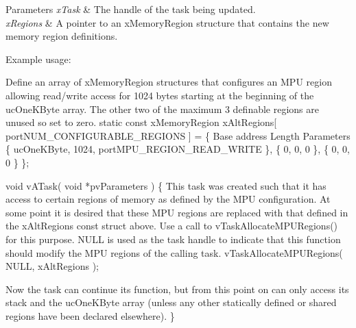 \begin{DoxyParams}{Parameters}
{\em x\-Task} & The handle of the task being updated.\\
\hline
{\em x\-Regions} & A pointer to an x\-Memory\-Region structure that contains the new memory region definitions.\\
\hline
\end{DoxyParams}
Example usage\-: 
\begin{DoxyPre}
Define an array of xMemoryRegion structures that configures an MPU region
allowing read/write access for 1024 bytes starting at the beginning of the
ucOneKByte array.  The other two of the maximum 3 definable regions are
unused so set to zero.
static const xMemoryRegion xAltRegions[ portNUM\_CONFIGURABLE\_REGIONS ] =
\{
Base address            Length          Parameters
        \{ ucOneKByte,           1024,           portMPU\_REGION\_READ\_WRITE \},
        \{ 0,                            0,                      0 \},
        \{ 0,                            0,                      0 \}
\};\end{DoxyPre}



\begin{DoxyPre}void vATask( void *pvParameters )
\{
This task was created such that it has access to certain regions of
memory as defined by the MPU configuration.  At some point it is
desired that these MPU regions are replaced with that defined in the
xAltRegions const struct above.  Use a call to vTaskAllocateMPURegions()
for this purpose.  NULL is used as the task handle to indicate that this
function should modify the MPU regions of the calling task.
        vTaskAllocateMPURegions( NULL, xAltRegions );\end{DoxyPre}



\begin{DoxyPre}Now the task can continue its function, but from this point on can only
access its stack and the ucOneKByte array (unless any other statically
defined or shared regions have been declared elsewhere).
\}
   \end{DoxyPre}
 